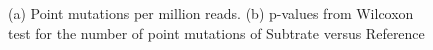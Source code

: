 

\begin{figure}[h!]
    \centering
    \caption{(a) Point mutations per million reads. (b) p-values from Wilcoxon test for the number of point mutations of Subtrate versus Reference}
    \label{both_hits_substrate}
\end{figure}


